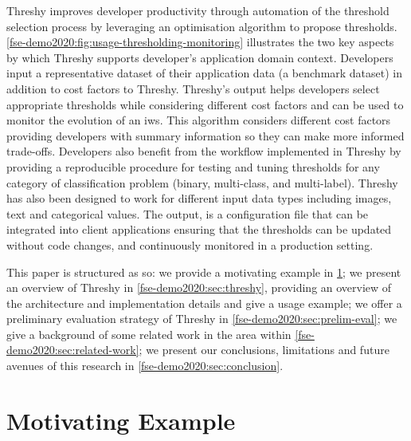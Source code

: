 Threshy improves developer productivity through automation of the threshold selection process by leveraging an optimisation algorithm to propose thresholds. \cref{fse-demo2020:fig:usage-thresholding-monitoring} illustrates the two key aspects by which Threshy supports developer's application domain context. Developers input a representative dataset of their application data (a benchmark dataset) in addition to cost factors to Threshy. Threshy's output helps developers select appropriate thresholds while considering different cost factors and can be used to monitor the evolution of an \gls{iws}.
This algorithm considers different cost factors providing developers with summary information so they can make more informed trade-offs. Developers also benefit from the workflow implemented in Threshy by providing a reproducible procedure for testing and tuning thresholds for any category of classification problem (binary, multi-class, and multi-label). Threshy has also been designed to work for different input data types including images, text and categorical values. The output, is a configuration file that can be integrated into client applications ensuring that the thresholds can be updated without code changes, and continuously monitored in a production setting. 

 This paper is structured as so: we provide a motivating example in \cref{fse-demo2020:sec:motivating-example}; we present an overview of Threshy in \cref{fse-demo2020:sec:threshy}, providing an overview of the architecture and implementation details and give a usage example; we offer a preliminary evaluation strategy of Threshy in \cref{fse-demo2020:sec:prelim-eval}; we give a background of some related work in the area within \cref{fse-demo2020:sec:related-work}; we present our conclusions, limitations and future avenues of this research in \cref{fse-demo2020:sec:conclusion}.


\section{Motivating Example}
\label{fse-demo2020:sec:motivating-example}

